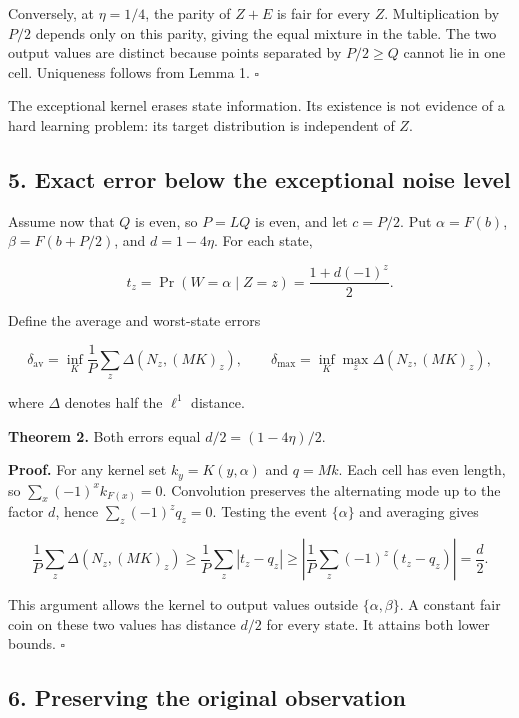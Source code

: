 \documentclass[
]{article}
\begin{document}
Conversely, at \(\eta=1/4\), the parity of \(Z+E\) is fair for every
\(Z\). Multiplication by \(P/2\) depends only on this parity, giving the
equal mixture in the table. The two output values are distinct because
points separated by \(P/2\ge Q\) cannot lie in one cell. Uniqueness
follows from Lemma 1. \(\square\)

The exceptional kernel erases state information. Its existence is not
evidence of a hard learning problem: its target distribution is
independent of \(Z\).

\subsection{5. Exact error below the exceptional noise
level}\label{exact-error-below-the-exceptional-noise-level}

Assume now that \(Q\) is even, so \(P=LQ\) is even, and let \(c=P/2\).
Put \(\alpha=F(b)\), \(\beta=F(b+P/2)\), and \(d=1-4\eta\). For each
state,

\[
t_z=\Pr(W=\alpha\mid Z=z)=\frac{1+d(-1)^z}{2}.
\]

Define the average and worst-state errors

\[
\delta_{\mathrm{av}}=\inf_K\frac1P\sum_z\Delta(N_z,(MK)_z),\qquad
\delta_{\max}=\inf_K\max_z\Delta(N_z,(MK)_z),
\]

where \(\Delta\) denotes half the \(\ell^1\) distance.

\textbf{Theorem 2.} Both errors equal \(d/2=(1-4\eta)/2\).

\textbf{Proof.} For any kernel set \(k_y=K(y,\alpha)\) and \(q=Mk\).
Each cell has even length, so \(\sum_x(-1)^x k_{F(x)}=0\). Convolution
preserves the alternating mode up to the factor \(d\), hence
\(\sum_z(-1)^zq_z=0\). Testing the event \(\{\alpha\}\) and averaging
gives

\[
\frac1P\sum_z\Delta(N_z,(MK)_z)
\ge\frac1P\sum_z|t_z-q_z|
\ge\left|\frac1P\sum_z(-1)^z(t_z-q_z)\right|=\frac d2.
\]

This argument allows the kernel to output values outside
\(\{\alpha,\beta\}\). A constant fair coin on these two values has
distance \(d/2\) for every state. It attains both lower bounds.
\(\square\)

\subsection{6. Preserving the original
observation}\label{preserving-the-original-observation}
\end{document}

